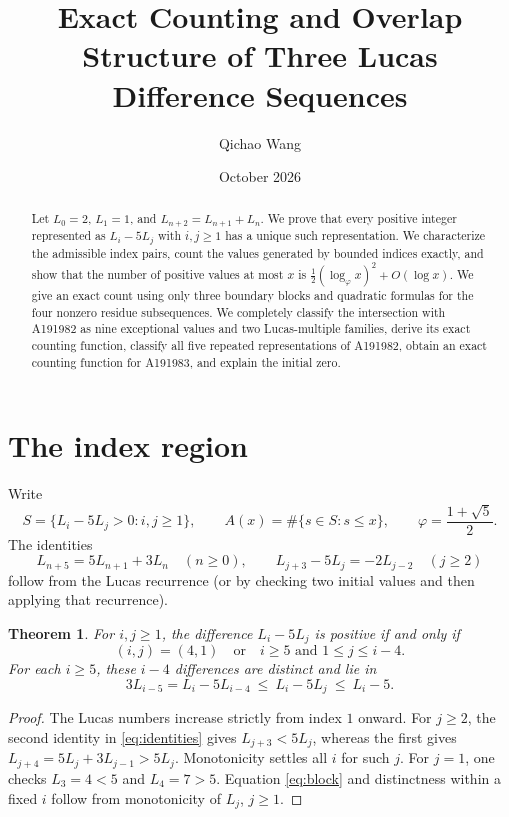 \documentclass[11pt]{article}
\title{Exact Counting and Overlap Structure of Three Lucas Difference Sequences}
\author{Qichao Wang}
\date{October 2026}
\newtheorem{theorem}{Theorem}
\begin{document}
\maketitle
\begin{abstract}
Let $L_0=2$, $L_1=1$, and $L_{n+2}=L_{n+1}+L_n$. We prove that every positive integer represented as $L_i-5L_j$ with $i,j\geq1$ has a unique such representation. We characterize the admissible index pairs, count the values generated by bounded indices exactly, and show that the number of positive values at most $x$ is $\frac12(\log_\varphi x)^2+O(\log x)$. We give an exact count using only three boundary blocks and quadratic formulas for the four nonzero residue subsequences. We completely classify the intersection with A191982 as nine exceptional values and two Lucas-multiple families, derive its exact counting function, classify all five repeated representations of A191982, obtain an exact counting function for A191983, and explain the initial zero.
\end{abstract}

\section*{The index region}
Write
\[
 S=\{L_i-5L_j>0:i,j\ge1\},\qquad
 A(x)=\#\{s\in S:s\le x\},\qquad
 \varphi=\frac{1+\sqrt5}{2}.
\]
The identities
\begin{equation}\label{eq:identities}
 L_{n+5}=5L_{n+1}+3L_n\quad(n\ge0),\qquad
 L_{j+3}-5L_j=-2L_{j-2}\quad(j\ge2)
\end{equation}
follow from the Lucas recurrence (or by checking two initial values and then applying that recurrence).

\begin{theorem}\label{thm:region}
For $i,j\ge1$, the difference $L_i-5L_j$ is positive if and only if
\[
 (i,j)=(4,1)\quad\text{or}\quad i\ge5\text{ and }1\le j\le i-4.
\]
For each $i\ge5$, these $i-4$ differences are distinct and lie in
\begin{equation}\label{eq:block}
 3L_{i-5}=L_i-5L_{i-4}\ \le\ L_i-5L_j\ \le\ L_i-5.
\end{equation}
\end{theorem}
\begin{proof}
The Lucas numbers increase strictly from index $1$ onward. For $j\ge2$, the second identity in \eqref{eq:identities} gives $L_{j+3}<5L_j$, whereas the first gives $L_{j+4}=5L_j+3L_{j-1}>5L_j$. Monotonicity settles all $i$ for such $j$. For $j=1$, one checks $L_3=4<5$ and $L_4=7>5$. Equation \eqref{eq:block} and distinctness within a fixed $i$ follow from monotonicity of $L_j$, $j\ge1$.
\end{proof}
\end{document}
